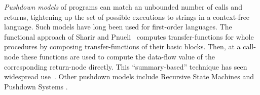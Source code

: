 \documentclass{LMCS}
\theoremstyle{definition} \newtheorem{property}[thm]{Property}
\begin{document}
\emph{Pushdown models} of programs can match an unbounded number of calls and 
returns, tightening up the set of possible executions to strings in a 
context-free language.
Such models have long been used for first-order languages.
The functional approach of Sharir and 
Pnueli~\cite{book/flowanalysis/81/sharir/interproc} computes transfer-functions 
for whole procedures by composing transfer-functions of their basic blocks.
Then, at a call-node these functions are used to compute the data-flow value
of the corresponding return-node directly.
This ``summary-based'' technique has seen widespread 
use~\cite{conf/popl/95/reps/interproc, conf/popl/08/chaudhuri/subcubic}.
Other pushdown models include Recursive State Machines 
\cite{journal/toplas/05/alur/rsm} and Pushdown Systems 
\cite{journal/entcs/97/finkel/pds, conf/concur/97/bouajjani/pds}.
\end{document}
